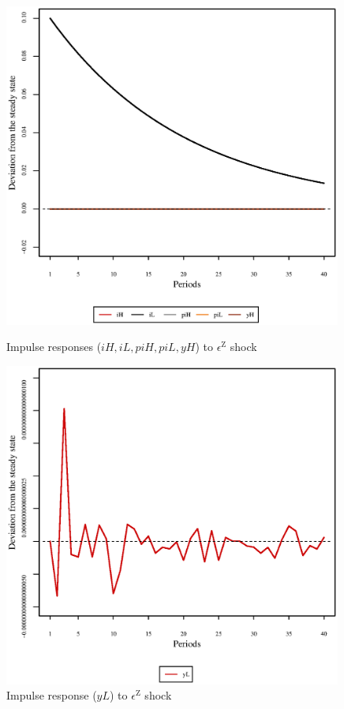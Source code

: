 \begin{figure}[h]
\begin{minipage}{0.5\textwidth}
\vspace*{-3em}
\centering
\includegraphics[width=0.99\textwidth, scale=0.55]{plots/plot_12.eps}
\caption{Impulse responses (${i\!H}, {i\!L}, {p\!i\!H}, {p\!i\!L}, {y\!H}$) to $\epsilon^{\mathrm{Z}}$ shock}
\end{minipage}
\begin{minipage}{0.5\textwidth}
\vspace*{-3em}
\centering
\includegraphics[width=0.99\textwidth, scale=0.55]{plots/plot_13.eps}
\caption{Impulse response (${y\!L}$) to $\epsilon^{\mathrm{Z}}$ shock}
\end{minipage}
\end{figure}


